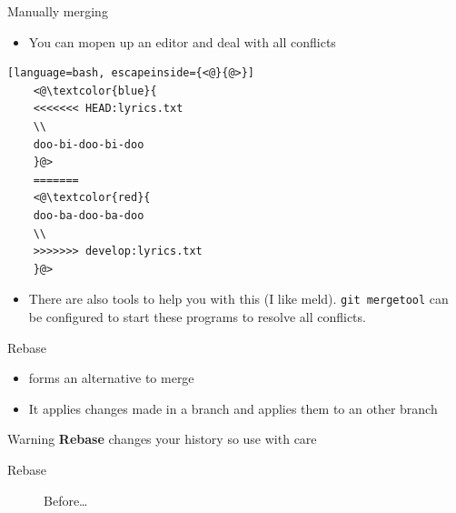 \documentclass[12pt]{beamer}
\begin{document}
\begin{frame}[fragile]{Manually merging}
		\begin{itemize}
			\item You can mopen up an editor and deal with all conflicts
		\end{itemize}
	\begin{lstlisting}[language=bash, escapeinside={<@}{@>}]
	<@\textcolor{blue}{ 
	<<<<<<< HEAD:lyrics.txt
	\\
	doo-bi-doo-bi-doo
	}@> 
	=======
	<@\textcolor{red}{ 
	doo-ba-doo-ba-doo 
	\\
	>>>>>>> develop:lyrics.txt 
	}@>
	\end{lstlisting}
		\begin{itemize}
		\item There are also tools to help you with this (I like meld). \texttt{git mergetool} can be configured to start these programs to resolve all conflicts.
		\end{itemize}
\end{frame}

\begin{frame}[fragile]{Rebase}
	\begin{itemize}
		\item \texttt{} forms an alternative to merge
		\item It applies changes made in a branch and applies them to an other branch
	\end{itemize}
 \begin{alertblock}{Warning}
	\textbf{Rebase} changes your history so use with care
\end{alertblock}

\end{frame}

\begin{frame}[fragile]{Rebase}
\begin{figure}
		\centering
		\caption{Before\ldots}

	\end{figure}
\end{frame}
\end{document}
